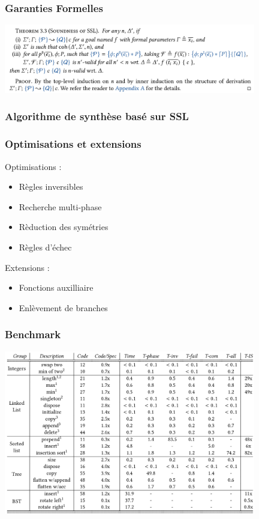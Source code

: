 \documentclass[french]{beamer}
\begin{document}
\begin{frame}[fragile]
	\frametitle{Garanties Formelles}
	\includegraphics[width=11cm]{figures/thm.png}
\end{frame}
\begin{frame}[fragile]
	\frametitle{Algorithme de synthèse basé sur SSL}
\end{frame}
\begin{frame}[fragile]
	\frametitle{Optimisations et extensions}
	Optimisations :
	\begin{itemize}
		\item Règles inversibles
		\pause
		\item Recherche multi-phase
		\pause
		\item Rèduction des symétries
		\pause
		\item Règles d'échec 
	\end{itemize}
	\pause
	Extensions :
	\begin{itemize}
	\item Fonctions auxilliaire
	\pause
	\item Enlèvement de branches	
	\end{itemize}
\end{frame}
\begin{frame}
	\frametitle{Benchmark}
	\includegraphics[width=11cm]{figures/benchmark.png}
\end{frame}
\end{document}
